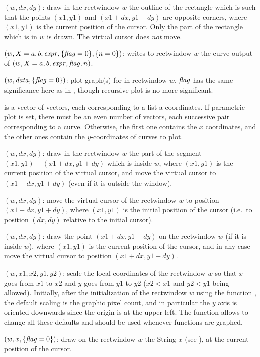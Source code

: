 $(w,dx,dy)$: draw in the rectwindow $w$ the outline of
the rectangle which is such that the points $(x1,y1)$ and $(x1+dx,y1+dy)$ are
opposite corners, where $(x1,y1)$ is the current position of the cursor.
Only the part of the rectangle which is in $w$ is drawn. The virtual cursor
does \emph{not} move.

$(w,X=a,b,\hbox{\it expr\/},\{\hbox{\it f\kern0pt lag\/}=0\},\{n=0\})$: writes to
rectwindow $w$ the curve output of $(w,X=a,b,\hbox{\it expr\/},\hbox{\it f\kern0pt lag\/},n)$.

$(w,\hbox{\it data\/},\{\hbox{\it f\kern0pt lag\/}=0\})$: plot graph(s) for
 in rectwindow $w$. $\hbox{\it f\kern0pt lag\/}$ has the same significance here as in
, though recursive plot is no more significant.

 is a vector of vectors, each corresponding to a list a coordinates.
If parametric plot is set, there must be an even number of vectors, each
successive pair corresponding to a curve. Otherwise, the first one contains
the $x$ coordinates, and the other ones contain the $y$-coordinates
of curves to plot.

$(w,dx,dy)$: draw in the rectwindow $w$ the part of the
segment $(x1,y1)-(x1+dx,y1+dy)$ which is inside $w$, where $(x1,y1)$ is the
current position of the virtual cursor, and move the virtual cursor to
$(x1+dx,y1+dy)$ (even if it is outside the window).

$(w,dx,dy)$: move the virtual cursor of the rectwindow
$w$ to position $(x1+dx,y1+dy)$, where $(x1,y1)$ is the initial position of
the cursor (i.e.~to position $(dx,dy)$ relative to the initial cursor).

$(w,dx,dy)$: draw the point $(x1+dx,y1+dy)$ on the
rectwindow $w$ (if it is inside $w$), where $(x1,y1)$ is the current position
of the cursor, and in any case move the virtual cursor to position
$(x1+dx,y1+dy)$.

$(w,x1,x2,y1,y2)$: scale the local coordinates of the
rectwindow $w$ so that $x$ goes from $x1$ to $x2$ and $y$ goes from $y1$ to
$y2$ ($x2<x1$ and $y2<y1$ being allowed). Initially, after the initialization
of the rectwindow $w$ using the function , the default scaling
is the graphic pixel count, and in particular the $y$ axis is oriented
downwards since the origin is at the upper left. The function 
allows to change all these defaults and should be used whenever functions are
graphed.

$(w,x,\{\hbox{\it f\kern0pt lag\/}=0\})$: draw on the rectwindow $w$ the
String $x$ (see ), at the current position of the cursor.


